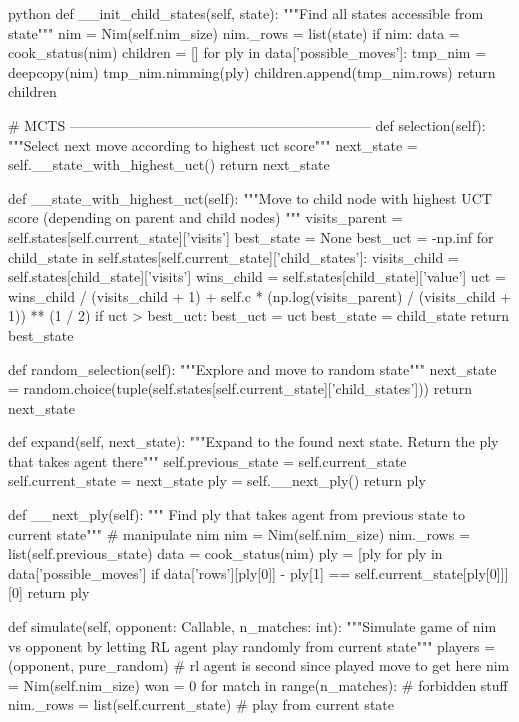 \begin{mintedbox}{python}
    def __init_child_states(self, state):
        """Find all states accessible from state"""
        nim = Nim(self.nim_size)
        nim._rows = list(state)
        if nim:
            data = cook_status(nim)
            children = []
            for ply in data['possible_moves']:
                tmp_nim = deepcopy(nim)
                tmp_nim.nimming(ply)
                children.append(tmp_nim.rows)
            return children

    # MCTS -----------------------------------------------------------------
    def selection(self):
        """Select next move according to highest uct score"""
        next_state = self.__state_with_highest_uct()
        return next_state

    def __state_with_highest_uct(self):
        """Move to child node with highest UCT score (depending on parent and child nodes) """
        visits_parent = self.states[self.current_state]['visits']
        best_state = None
        best_uct = -np.inf
        for child_state in self.states[self.current_state]['child_states']:
            visits_child = self.states[child_state]['visits']
            wins_child = self.states[child_state]['value']
            uct = wins_child / (visits_child + 1) + self.c * (np.log(visits_parent) / (visits_child + 1)) ** (1 / 2)
            if uct > best_uct:
                best_uct = uct
                best_state = child_state
        return best_state

    def random_selection(self):
        """Explore and move to random state"""
        next_state = random.choice(tuple(self.states[self.current_state]['child_states']))
        return next_state

    def expand(self, next_state):
        """Expand to the found next state. Return the ply that takes agent there"""
        self.previous_state = self.current_state
        self.current_state = next_state
        ply = self.__next_ply()
        return ply

    def __next_ply(self):
        """ Find ply that takes agent from previous state to current state"""
        # manipulate nim
        nim = Nim(self.nim_size)
        nim._rows = list(self.previous_state)
        data = cook_status(nim)
        ply = [ply for ply in data['possible_moves'] if data['rows'][ply[0]] - ply[1] == self.current_state[ply[0]]][0]
        return ply

    def simulate(self, opponent: Callable, n_matches: int):
        """Simulate game of nim vs opponent by letting RL agent play randomly from current state"""
        players = (opponent, pure_random)  # rl agent is second since played move to get here
        nim = Nim(self.nim_size)
        won = 0
        for match in range(n_matches):
            # forbidden stuff
            nim._rows = list(self.current_state)  # play from current state


\end{mintedbox}
